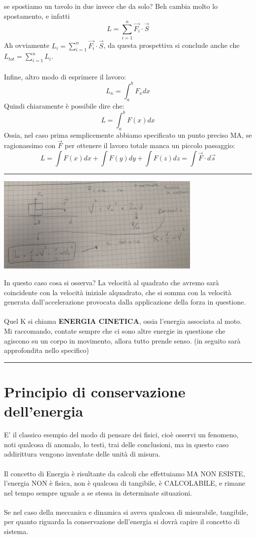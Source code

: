 \documentclass[12pt, a4paper, openany, oneside]{book}
\begin{document}
se spostiamo un tavolo in due invece che da solo? Beh cambia molto lo 
spostamento, e infatti \[L = \sum_{i=1}^{n} \overrightarrow{F_{i}} \cdot \overrightarrow{S}\]
Ah ovviamente $L_{i} = \sum_{i=1}^{n} \overrightarrow{F_{i}} \cdot \overrightarrow{S}$,
da questa prospettiva si conclude anche che $L_{tot} = \sum_{i=1}^{n} L_{i}$.
\\ \\
Infine, altro modo di esprimere il lavoro:
\[L_{\kappa} = \int_{a}^{b} F_{\kappa}dx  \]
Quindi chiaramente è possibile dire che:
\[L = \int_{a}^{b} F(x) dx\]
Ossia, nel caso prima semplicemente abbiamo specificato un punto preciso MA,
se ragionassimo con $\overrightarrow{F}$ per ottenere il lavoro totale manca un
piccolo passaggio:
\[L = \int F(x) dx + \int F(y) dy + \int F(z) dz = \int \overrightarrow{F}\cdot 
d \overrightarrow{s}\]
{\color{black} \rule{\linewidth}{0.3mm} }
\begin{center}
\includegraphics[width=0.75\textwidth]{velocitalavoro}
\end{center}
In questo caso cosa si osserva? La velocità al quadrato che avremo sarà coincidente
con la velocità iniziale alquadrato, che si somma con la velocità generata
dall'accelerazione provocata dalla applicazione della forza in questione.\\ \\
Quel K si chiama \textbf{ENERGIA CINETICA}, ossia l'energia associata al moto. Mi raccomando,
contate sempre che ci sono altre energie in questione che agiscono su un corpo
in movimento, allora tutto prende senso. (in seguito sarà approfondita nello
specifico)
\\
{\color{black} \rule{\linewidth}{0.3mm} }
\chapter{Principio di conservazione dell'energia}
E' il classico esempio del modo di pensare dei fisici, cioè osservi un fenomeno,
noti qualcosa di anomalo, lo testi, trai delle conclusioni, ma in questo caso
addirittura vengono inventate delle unità di misura.
\\ \\
Il concetto di Energia è risultante da calcoli che effettuiamo MA NON ESISTE, 
l'energia NON è fisica, non è qualcosa di tangibile, è CALCOLABILE, e rimane
nel tempo sempre uguale a se stessa in determinate situazioni. \\ \\
Se nel caso della meccanica e dinamica si aveva qualcosa di misurabile, tangibile,
per quanto riguarda la conservazione dell'energia si dovrà capire il concetto di
sistema.
\end{document}
